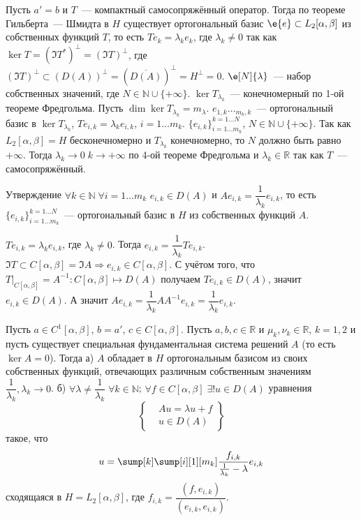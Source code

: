 \documentclass[14pt]{extarticle}
\begin{document}
Пусть $a' = b$ и $T$~--- компактный самосопряжённый оператор.
Тогда по теореме Гильберта~--- Шмидта в $H$ существует ортогональный базис 
$\e{e} \subset L_2[\alpha, \beta]$ из собственных функций $T$, то есть $Te_k = \lambda_k
e_k$, где $\lambda_k \ne 0$ так как $\ker  T = (\Im T^*)^\perp = (\Im T)^\perp$, где
$(\Im T)^\perp \subset (D(A))^\perp = \left(\overline{D(A)}\right)^\perp = H^\perp = 0$.
$\e[N]{\lambda}$~--- набор собственных значений, где $N \in \mathbb N \cup \{+\infty\}$.
$\ker T_{\lambda_k}$~--- конечномерный по 1-ой теореме Фредгольма.
Пусть $\dim \ker T_{\lambda_k} = m_\lambda$.
$e_{1, k}\dots _{m_k, k}$~--- ортогональный базис в $\ker T_{\lambda_k}$, $Te_{i,k} = 
\lambda_k e_{i,k}$, $i =1\dots m_k$. $\{e_{i,k}\}^{k = 1 \dots N}_{i = 1 \dots m_k}$,
$N \in \mathbb N \cup \{+\infty\}$.
Так как $L_2[\alpha, \beta] = H$ бесконечномерно и $T_{\lambda_k}$ конечномерно, то
$N$ должно быть равно $+\infty$.
Тогда $\lambda_k \to 0\; k \to +\infty$ по 4-ой теореме Фредгольма и $\lambda_k \in \mathbb 
R$ так как $T$~--- самосопряжённый.
\begin{MathCl}{Утверждение}
    $\forall k \in \mathbb N\; \forall i = 1 \dots m_k$ $e_{i, k} \in D(A)$ и $A e_{i,k} =
    \dfrac{1}{\lambda_k}e_{i,k}$, то есть $\{e_{i,k}\}^{k = 1 \dots N}_{i = 1 \dots m_k}$~---
    ортогональный базис в $H$ из собственных функций $A$.
\end{MathCl}
\begin{Proof}
    $T e_{i, k} = \lambda_k e_{i, k}$, где $\lambda_k \ne 0$.
    Тогда $e_{i, k} = \dfrac{1}{\lambda_k} Te_{i, k}$.
    $\Im T \subset C[\alpha, \beta] = \Im A \Rightarrow e_{i, k} \in C[\alpha, \beta]$.
    С учётом того, что $T|_{C[\alpha, \beta]} = A^{-1} : C[\alpha, \beta] \mapsto D(A)$
    получаем $T e_{i, k} \in D(A)$, значит $e_{i,k} \in D(A)$.
    А значит $A e_{i, k} = \dfrac{1}{\lambda_k}A A^{-1} e_{i, k} = \dfrac{1}{\lambda_k} e_{i,k}$.
\end{Proof}
\begin{Theor}[Стеклова]
    Пусть $a \in C^1[\alpha, \beta]$, $b = a'$, $c \in C[\alpha, \beta]$. Пусть $a, b ,c \in \mathbb R
    $ и $\mu_k, \nu_k \in \mathbb R$, $k = 1, 2$ и пусть существует специальная 
    фундаментальная система решений $A$ (то есть $\ker A = 0$).
    Тогда а) $A$ обладает в $H$ ортогональным базисом из своих собственных функций,
    отвечающих различным собственным значениям $\dfrac{1}{\lambda_k}, \lambda_k \to 0$.
    б) $\forall \lambda \ne \dfrac{1}{\lambda_k}\;\forall k \in \mathbb N$; $\forall f \in C[\alpha,
    \beta]\; \exists! u \in D(A)$ уравнения
    $$
    \left\{
    \begin{aligned}
        &Au = \lambda u + f\\
        &u \in D(A)
    \end{aligned}
    \right\}
    $$
    такое, что 
    $$
    u = \sump[k] \sump[i][1][m_k]\dfrac{f_{i,k}}{\frac{1}{\lambda_k} - \lambda} e_{i,k}
    $$
    сходящаяся в $H = L_2[\alpha, \beta]$, где $f_{i,k} = \dfrac{(f, e_{i,k})}{(e_{i,k}, e_{i,k})}$.
\end{Theor}
\end{document}
